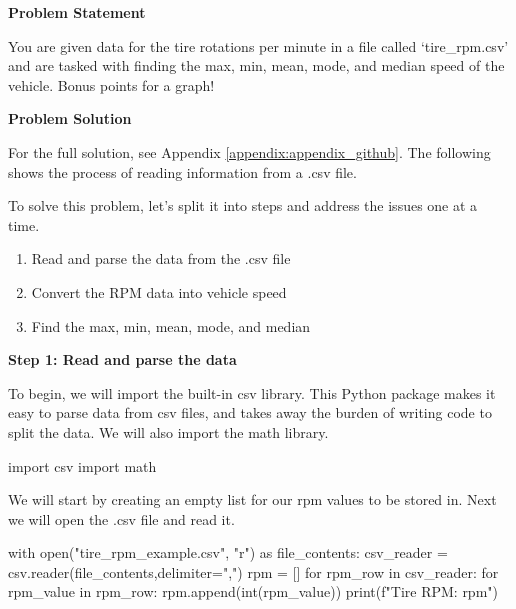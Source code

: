 \begin{tcolorbox}[breakable, enhanced jigsaw, title=DEN 161: Assignment \ref{engg_prob_solve_assignment_1}, 
    colframe=ksu-purple, colback=ksu-gray]

    \textbf{Problem Statement}
    \parindent15pt

    You are given data for the tire rotations per minute in a file called `tire\_rpm.csv' and are tasked with 
    finding the max, min, mean, mode, and median speed of the vehicle. Bonus points for a graph!

    \tcblower
    \textbf{Problem Solution}
    \parindent15pt

    For the full solution, see Appendix \ref{appendix:appendix_github}. The following shows the process
    of reading information from a .csv file.
    
    To solve this problem, let's split it into steps and address the issues one at a time.

    \begin{enumerate}
        \item Read and parse the data from the .csv file
        \item Convert the RPM data into vehicle speed 
        \item Find the max, min, mean, mode, and median
    \end{enumerate}
    
    \noindent \textbf{Step 1: Read and parse the data}
    
    To begin, we will import the built-in csv library. This Python package makes it easy to parse data from csv 
    files, and takes away the burden of writing code to split the data. We will also import the math library.

\begin{python}
import csv
import math
\end{python}

    We will start by creating an empty list for our rpm values to be stored in. Next we will open the .csv 
    file and read it.

\begin{python}
with open("tire_rpm_example.csv", "r") as file_contents:
csv_reader = csv.reader(file_contents,delimiter=",")
rpm = []
for rpm_row in csv_reader:
    for rpm_value in rpm_row:
        rpm.append(int(rpm_value))
print(f"Tire RPM: {rpm}")
\end{python}
\end{tcolorbox}

